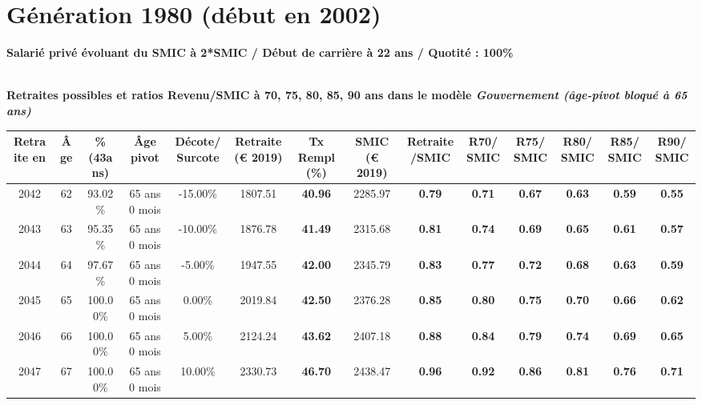 \newpage 
 
\section{Génération 1980 (début en 2002)\label{Ascendant12_100_1980_22_0}} 
 
{\bf \noindent Salarié privé évoluant du SMIC à 2*SMIC / Début de carrière à 22 ans / Quotité : 100\%}  ~ 

 ~\\{\bf \noindent Retraites possibles et ratios Revenu/SMIC à 70, 75, 80, 85, 90 ans dans le modèle \emph{Gouvernement (âge-pivot bloqué à 65 ans)}}  
 
\begin{adjustbox}{max width=\textwidth} 
\begin{tabular}[htb]{|c|c||c|c|c||c|c||c|c||c|c|c|c|c|} 
\hline 
 Retraite en &  Âge &  \%(43ans) &  Âge pivot &  Décote/Surcote &  Retraite (\euro{} 2019) &  Tx Rempl(\%) &  SMIC (\euro{} 2019) &  Retraite/SMIC &  R70/SMIC &  R75/SMIC &  R80/SMIC &  R85/SMIC &  R90/SMIC \\ 
\hline \hline 
 2042 &  62 &  93.02\% &  65 ans 0 mois &  -15.00\% &  1807.51 &  {\bf 40.96} &  2285.97 &  {\bf {\color{red} 0.79}} &  {\bf {\color{red} 0.71}} &  {\bf {\color{red} 0.67}} &  {\bf {\color{red} 0.63}} &  {\bf {\color{red} 0.59}} &  {\bf {\color{red} 0.55}} \\ 
\hline 
 2043 &  63 &  95.35\% &  65 ans 0 mois &  -10.00\% &  1876.78 &  {\bf 41.49} &  2315.68 &  {\bf {\color{red} 0.81}} &  {\bf {\color{red} 0.74}} &  {\bf {\color{red} 0.69}} &  {\bf {\color{red} 0.65}} &  {\bf {\color{red} 0.61}} &  {\bf {\color{red} 0.57}} \\ 
\hline 
 2044 &  64 &  97.67\% &  65 ans 0 mois &  -5.00\% &  1947.55 &  {\bf 42.00} &  2345.79 &  {\bf {\color{red} 0.83}} &  {\bf {\color{red} 0.77}} &  {\bf {\color{red} 0.72}} &  {\bf {\color{red} 0.68}} &  {\bf {\color{red} 0.63}} &  {\bf {\color{red} 0.59}} \\ 
\hline 
 2045 &  65 &  100.00\% &  65 ans 0 mois &  0.00\% &  2019.84 &  {\bf 42.50} &  2376.28 &  {\bf {\color{red} 0.85}} &  {\bf {\color{red} 0.80}} &  {\bf {\color{red} 0.75}} &  {\bf {\color{red} 0.70}} &  {\bf {\color{red} 0.66}} &  {\bf {\color{red} 0.62}} \\ 
\hline 
 2046 &  66 &  100.00\% &  65 ans 0 mois &  5.00\% &  2124.24 &  {\bf 43.62} &  2407.18 &  {\bf {\color{red} 0.88}} &  {\bf {\color{red} 0.84}} &  {\bf {\color{red} 0.79}} &  {\bf {\color{red} 0.74}} &  {\bf {\color{red} 0.69}} &  {\bf {\color{red} 0.65}} \\ 
\hline 
 2047 &  67 &  100.00\% &  65 ans 0 mois &  10.00\% &  2330.73 &  {\bf 46.70} &  2438.47 &  {\bf {\color{red} 0.96}} &  {\bf {\color{red} 0.92}} &  {\bf {\color{red} 0.86}} &  {\bf {\color{red} 0.81}} &  {\bf {\color{red} 0.76}} &  {\bf {\color{red} 0.71}} \\ 
\hline 
\hline 
\end{tabular} 
\end{adjustbox} 
 
